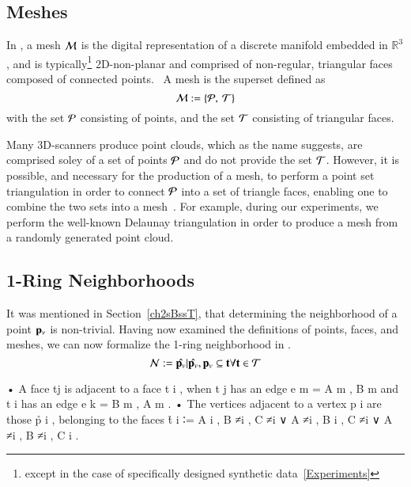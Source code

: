 \subsection{Meshes}
\label{ch2s3ssM}
In \tdd{}, a mesh $\mathcal{M}$ is the digital representation of a discrete manifold embedded in $\mathbb{R}^3$, and is typically\footnote{except in the case of specifically designed synthetic data~\ref{Experiments}} 2D-non-planar and comprised of non-regular, triangular faces composed of connected points.~\cite[p.~25]{Mara12} A mesh is the superset defined as
\begin{equation}
	\mathcal{M} := \left \{\mathcal{P},\:\mathcal{T}\right \}
	\label{eq:defineMesh}
\end{equation}%
%
with the set $\mathcal{P}$ consisting of points, and the set $\mathcal{T}$ consisting of triangular faces.

Many 3D-scanners produce point clouds\todoCitation{}{}, which as the name suggests, are comprised soley of a set of points $\mathcal{P}$ and do not provide the set $\mathcal{T}$. However, it is possible, and necessary for the production of a mesh, to perform a point set triangulation\todoCitation{}{} in order to connect $\mathcal{P}$ into a set of triangle faces, enabling one to combine the two sets into a mesh~\cite[p.~26]{Mara12}. For example, during our experiments, we perform the well-known Delaunay triangulation\todoCitation{} in order to produce a mesh from a randomly generated point cloud.
%
\subsection{1-Ring Neighborhoods}
\label{ch2s3ssNRN}
It was mentioned in Section~\ref{ch2sBssT}, that determining the neighborhood of a point $\mathbf{p}_v$ is non-trivial. Having now examined the definitions of points, faces, and meshes, we can now formalize the 1-ring neighborhood in \tdd{}. 
\begin{equation}
	\mathcal{N} := {\hat{\mathbf{p}_v} | {\hat{\mathbf{p}_v}, \mathbf{p}_v} \subseteq \mathbf{t} \forall \mathbf{t} \in \mathcal{T}}
	\label{eq:defineNeighborhood}
\end{equation}

• A face tj is adjacent to a face t i , when t j has an edge e m = {A m , B m }and t i has an edge e k = {B m , A m }.
• The vertices adjacent to a vertex p i are those p̊ i , belonging to the faces t̊ i ∶= {A i , B ≠i , C ≠i } ∨ {A ≠i , B i , C ≠i } ∨ {A ≠i , B ≠i , C i }.


